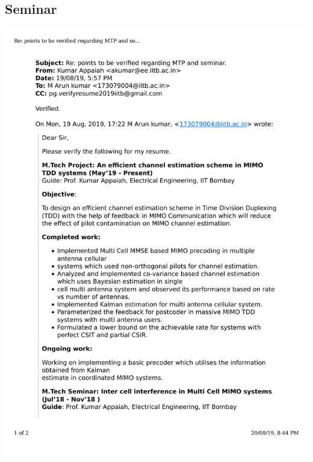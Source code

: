 \documentclass{article}
\begin{document}
	\subsection{Seminar}
		\includegraphics[page=1, scale=0.5]{proofs/mtp.pdf}\\
\end{document}
